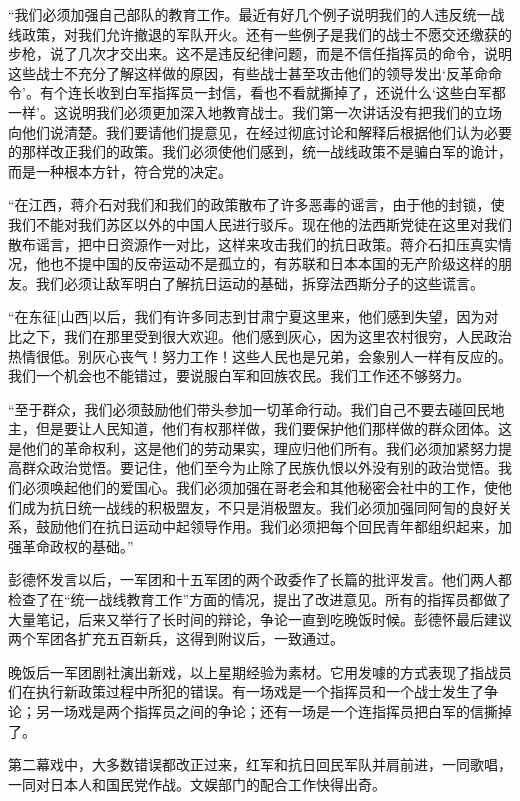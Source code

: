 \documentclass[10pt]{book}
\begin{document}
“我们必须加强自己部队的教育工作。最近有好几个例子说明我们的人违反统一战线政策，对我们允许撤退的军队开火。还有一些例子是我们的战士不愿交还缴获的步枪，说了几次才交出来。这不是违反纪律问题，而是不信任指挥员的命令，说明这些战士不充分了解这样做的原因，有些战士甚至攻击他们的领导发出‘反革命命令’。有个连长收到白军指挥员一封信，看也不看就撕掉了，还说什么‘这些白军都一样’。这说明我们必须更加深入地教育战士。我们第一次讲话没有把我们的立场向他们说清楚。我们要请他们提意见，在经过彻底讨论和解释后根据他们认为必要的那样改正我们的政策。我们必须使他们感到，统一战线政策不是骗白军的诡计，而是一种根本方针，符合党的决定。

“在江西，蒋介石对我们和我们的政策散布了许多恶毒的谣言，由于他的封锁，使我们不能对我们苏区以外的中国人民进行驳斥。现在他的法西斯党徒在这里对我们散布谣言，把中日资源作一对比，这样来攻击我们的抗日政策。蒋介石扣压真实情况，他也不提中国的反帝运动不是孤立的，有苏联和日本本国的无产阶级这样的朋友。我们必须让敌军明白了解抗日运动的基础，拆穿法西斯分子的这些谎言。

“在东征[山西]以后，我们有许多同志到甘肃宁夏这里来，他们感到失望，因为对比之下，我们在那里受到很大欢迎。他们感到灰心，因为这里农村很穷，人民政治热情很低。别灰心丧气！努力工作！这些人民也是兄弟，会象别人一样有反应的。我们一个机会也不能错过，要说服白军和回族农民。我们工作还不够努力。

“至于群众，我们必须鼓励他们带头参加一切革命行动。我们自己不要去碰回民地主，但是要让人民知道，他们有权那样做，我们要保护他们那样做的群众团体。这是他们的革命权利，这是他们的劳动果实，理应归他们所有。我们必须加紧努力提高群众政治觉悟。要记住，他们至今为止除了民族仇恨以外没有别的政治觉悟。我们必须唤起他们的爱国心。我们必须加强在哥老会和其他秘密会社中的工作，使他们成为抗日统一战线的积极盟友，不只是消极盟友。我们必须加强同阿訇的良好关系，鼓励他们在抗日运动中起领导作用。我们必须把每个回民青年都组织起来，加强革命政权的基础。”

彭德怀发言以后，一军团和十五军团的两个政委作了长篇的批评发言。他们两人都检查了在“统一战线教育工作”方面的情况，提出了改进意见。所有的指挥员都做了大量笔记，后来又举行了长时间的辩论，争论一直到吃晚饭时候。彭德怀最后建议两个军团各扩充五百新兵，这得到附议后，一致通过。

晚饭后一军团剧社演出新戏，以上星期经验为素材。它用发噱的方式表现了指战员们在执行新政策过程中所犯的错误。有一场戏是一个指挥员和一个战士发生了争论；另一场戏是两个指挥员之间的争论；还有一场是一个连指挥员把白军的信撕掉了。

第二幕戏中，大多数错误都改正过来，红军和抗日回民军队并肩前进，一同歌唱，一同对日本人和国民党作战。文娱部门的配合工作快得出奇。
\end{document}
